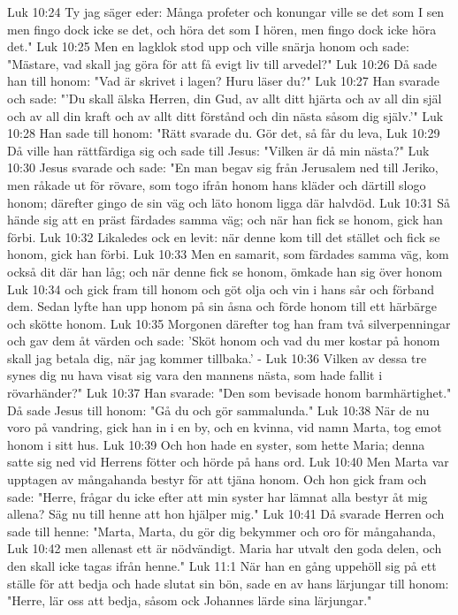 Luk 10:24  Ty jag säger eder: Många profeter och konungar ville se det som I sen men fingo dock icke se det, och höra det som I hören, men fingo dock icke höra det."
Luk 10:25  Men en lagklok stod upp och ville snärja honom och sade: "Mästare, vad skall jag göra för att få evigt liv till arvedel?"
Luk 10:26  Då sade han till honom: "Vad är skrivet i lagen? Huru läser du?"
Luk 10:27  Han svarade och sade: "'Du skall älska Herren, din Gud, av allt ditt hjärta och av all din själ och av all din kraft och av allt ditt förstånd och din nästa såsom dig själv.'"
Luk 10:28  Han sade till honom: "Rätt svarade du. Gör det, så får du leva,
Luk 10:29  Då ville han rättfärdiga sig och sade till Jesus: "Vilken är då min nästa?"
Luk 10:30  Jesus svarade och sade: "En man begav sig från Jerusalem ned till Jeriko, men råkade ut för rövare, som togo ifrån honom hans kläder och därtill slogo honom; därefter gingo de sin väg och läto honom ligga där halvdöd.
Luk 10:31  Så hände sig att en präst färdades samma väg; och när han fick se honom, gick han förbi.
Luk 10:32  Likaledes ock en levit: när denne kom till det stället och fick se honom, gick han förbi.
Luk 10:33  Men en samarit, som färdades samma väg, kom också dit där han låg; och när denne fick se honom, ömkade han sig över honom
Luk 10:34  och gick fram till honom och göt olja och vin i hans sår och förband dem. Sedan lyfte han upp honom på sin åsna och förde honom till ett härbärge och skötte honom.
Luk 10:35  Morgonen därefter tog han fram två silverpenningar och gav dem åt värden och sade: 'Sköt honom och vad du mer kostar på honom skall jag betala dig, när jag kommer tillbaka.' -
Luk 10:36  Vilken av dessa tre synes dig nu hava visat sig vara den mannens nästa, som hade fallit i rövarhänder?"
Luk 10:37  Han svarade: "Den som bevisade honom barmhärtighet." Då sade Jesus till honom: "Gå du och gör sammalunda."
Luk 10:38  När de nu voro på vandring, gick han in i en by, och en kvinna, vid namn Marta, tog emot honom i sitt hus.
Luk 10:39  Och hon hade en syster, som hette Maria; denna satte sig ned vid Herrens fötter och hörde på hans ord.
Luk 10:40  Men Marta var upptagen av mångahanda bestyr för att tjäna honom. Och hon gick fram och sade: "Herre, frågar du icke efter att min syster har lämnat alla bestyr åt mig allena? Säg nu till henne att hon hjälper mig."
Luk 10:41  Då svarade Herren och sade till henne: "Marta, Marta, du gör dig bekymmer och oro för mångahanda,
Luk 10:42  men allenast ett är nödvändigt. Maria har utvalt den goda delen, och den skall icke tagas ifrån henne."
Luk 11:1  När han en gång uppehöll sig på ett ställe för att bedja och hade slutat sin bön, sade en av hans lärjungar till honom: "Herre, lär oss att bedja, såsom ock Johannes lärde sina lärjungar."
